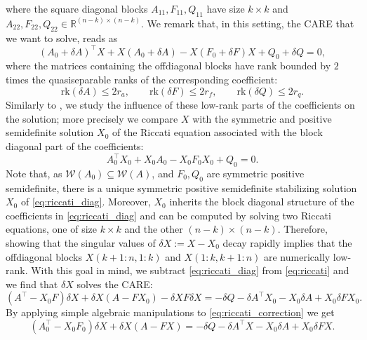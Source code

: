 \documentclass[a4paper,10pt]{article}
\begin{document}
where the square diagonal blocks $A_{11},F_{11},Q_{11}$ have size $k\times k$ and $A_{22},F_{22},Q_{22}\in\mathbb R^{(n-k)\times (n-k)}$. We remark that, in this setting, the CARE that we want to solve, reads as
\begin{equation}\label{eq:riccati}
	(A_0+\delta A)^\top X+X(A_0 +\delta A)-X(F_0+\delta F)X+Q_0+\delta Q=0,
\end{equation}
where the matrices containing the offdiagonal blocks have rank bounded by $2$ times the quasiseparable ranks of the corresponding coefficient:
$$
\mathrm{rk}(\delta A)\le 2r_a,\qquad \mathrm{rk}(\delta F)\le 2r_f,\qquad \mathrm{rk}(\delta Q)\le 2r_q.
$$
Similarly to \cite{kressner20}, we study the influence of these low-rank parts of the coefficients on the solution; more precisely we compare $X$ with the symmetric and positive semidefinite solution $X_0$  of the Riccati equation associated with the block diagonal part of the coefficients:
\begin{equation}\label{eq:riccati_diag}
	A_0^\top X_0+X_0A_0-X_0F_0X_0+Q_0=0.
\end{equation}
Note that, as $\mathcal W(A_0)\subseteq \mathcal W(A)$, and $F_0,Q_0$ are symmetric positive semidefinite, there is a unique symmetric positive semidefinite stabilizing solution $X_0$ of \eqref{eq:riccati_diag}. Moreover, $X_0$ inherits the block diagonal structure of  the coefficients in \eqref{eq:riccati_diag} and can be computed by solving two Riccati equations, one of size $k\times k$ and the other $(n-k)\times (n-k)$. Therefore, showing that the singular values of $\delta X:= X-X_0$ decay rapidly  implies that the offdiagonal blocks $X(k+1:n,1:k)$ and $X(1:k, k+1:n)$ are numerically low-rank.
With this goal in mind, we subtract \eqref{eq:riccati_diag} from \eqref{eq:riccati} and we find that $\delta X$ solves the CARE:
\begin{equation}\label{eq:riccati_correction}
	(A^\top-X_0F)\delta X + \delta X(A-FX_0)-\delta X F \delta X=-\delta Q-\delta A^\top X_0-X_0\delta A +X_0\delta F X_0.
\end{equation}
By applying simple algebraic manipulations to \eqref{eq:riccati_correction} we get
\begin{equation}\label{eq:lyapunov_correction}
	(A_0^\top-X_0F_0)\delta X +\delta X(A-FX)= -\delta Q -\delta A^\top X-X_0\delta A+ X_0\delta FX.
\end{equation}
\end{document}
